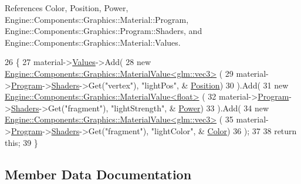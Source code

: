 References Color, Position, Power, Engine\+::\+Components\+::\+Graphics\+::\+Material\+::\+Program, Engine\+::\+Components\+::\+Graphics\+::\+Program\+::\+Shaders, and Engine\+::\+Components\+::\+Graphics\+::\+Material\+::\+Values.


\begin{DoxyCode}
26 \{
27     material->\mbox{\hyperlink{classEngine_1_1Components_1_1Graphics_1_1Material_a34335608ba1e6eb2c2dba5032107eab0}{Values}}->Add(
28         \textcolor{keyword}{new} \mbox{\hyperlink{classEngine_1_1Components_1_1Graphics_1_1MaterialValue}{Engine::Components::Graphics::MaterialValue<glm::vec3>}}
      (
29             material->\mbox{\hyperlink{classEngine_1_1Components_1_1Graphics_1_1Material_a2a4084db93bb70cd65032baf296803d6}{Program}}->\mbox{\hyperlink{classEngine_1_1Components_1_1Graphics_1_1Program_aff39fa56fc1fab1bce6c8a5ce29ae161}{Shaders}}->Get(\textcolor{stringliteral}{"vertex"}), \textcolor{stringliteral}{"lightPos"}, &
      \mbox{\hyperlink{classLight_ab6a04fde7b96f06ab935cd1d53b91e0b}{Position}})
30     ).Add(
31         \textcolor{keyword}{new} \mbox{\hyperlink{classEngine_1_1Components_1_1Graphics_1_1MaterialValue}{Engine::Components::Graphics::MaterialValue<float>}}
      (
32             material->\mbox{\hyperlink{classEngine_1_1Components_1_1Graphics_1_1Material_a2a4084db93bb70cd65032baf296803d6}{Program}}->\mbox{\hyperlink{classEngine_1_1Components_1_1Graphics_1_1Program_aff39fa56fc1fab1bce6c8a5ce29ae161}{Shaders}}->Get(\textcolor{stringliteral}{"fragment"}), \textcolor{stringliteral}{"lightStrength"}, &
      \mbox{\hyperlink{classLight_a161f4944da390d9bc388091bafd59fe3}{Power}})
33     ).Add(
34         \textcolor{keyword}{new} \mbox{\hyperlink{classEngine_1_1Components_1_1Graphics_1_1MaterialValue}{Engine::Components::Graphics::MaterialValue<glm::vec3>}}
      (
35             material->\mbox{\hyperlink{classEngine_1_1Components_1_1Graphics_1_1Material_a2a4084db93bb70cd65032baf296803d6}{Program}}->\mbox{\hyperlink{classEngine_1_1Components_1_1Graphics_1_1Program_aff39fa56fc1fab1bce6c8a5ce29ae161}{Shaders}}->Get(\textcolor{stringliteral}{"fragment"}), \textcolor{stringliteral}{"lightColor"}, &
      \mbox{\hyperlink{classLight_ae5e1e9cb633cea9ad892e644354bd6d1}{Color}})
36     );
37 
38     \textcolor{keywordflow}{return} \textcolor{keyword}{this};
39 \}
\end{DoxyCode}


\subsection{Member Data Documentation}
\mbox{\label{classEngine_1_1Components_1_1Objects_1_1VertexObject_a401aa1eb0254e57d8295c2287749eed5}} 
